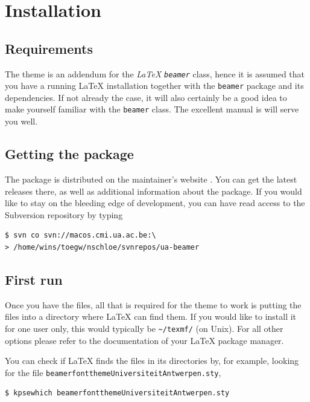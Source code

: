 \section{Installation}

\subsection{Requirements}
The theme is an addendum for the \emph{\LaTeX} \emph{\texttt{beamer}} class, hence it is assumed that you have a running \LaTeX{} installation together with the \texttt{beamer} package \cite{Tantau:2008:LBC} and its dependencies. If not already the case, it will also certainly be a good idea to make yourself familiar with the \texttt{beamer} class. The excellent manual \cite{Tantau:2007:UGB} is will serve you well.

\subsection{Getting the package}

The package is distributed on the maintainer's website \cite{Schloemer:2009:website}. You can get the latest releases there, as well as additional information about the package. If you would like to stay on the bleeding edge of development, you can have read access to the Subversion repository by typing
\begin{lstlisting}
$ svn co svn://macos.cmi.ua.ac.be:\
> /home/wins/toegw/nschloe/svnrepos/ua-beamer
\end{lstlisting}


\subsection{First run}
Once you have the files, all that is required for the theme to work is putting the files into a directory where \LaTeX{} can find them. If you would like to install it for one user only, this would typically be \lstinline{~/texmf/} (on Unix). For all other options please refer to the documentation of your \LaTeX{} package manager.

You can check if \LaTeX{} finds the files in its directories by, for example, looking for the file \lstinline!beamerfontthemeUniversiteitAntwerpen.sty!,
\begin{lstlisting}
$ kpsewhich beamerfontthemeUniversiteitAntwerpen.sty
\end{lstlisting}

